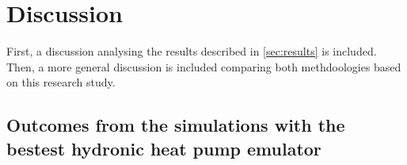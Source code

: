 \begin{comment}
\begin{figure}
  \texttt{[image: boptest/Fig7.eps]}
\caption{Indoor zone temperature through the simulation for the baseline, the MPC and program synthesis in typical heat period, together with the lower and upper comfort limits and temperature setpoint for baseline controller.}
\label{fig:7}       %
\end{figure}
%


The evolution in the thermal discomfort corresponds to this cumulative thermal discomfort along the simulation, depicted in Figure \ref{fig:8}.

\begin{figure}
\texttt{[image: boptest/Fig8.eps]}
\caption{Thermal discomfort for the baseline and the three MPC scenarios in the typical heat day simulation.}
\label{fig:8}       %
\end{figure}
%

The performance of the MPC compared to the baseline for the second objective, which is the reduction is cost, is reflected in Figure \ref{fig:9} which depicts the energy cost accross the simulation.

\begin{figure}
  \texttt{[image: boptest/Fig9.eps]}
\caption{Evolution of the energy cost for the baseline and MPC with different electricity price schemes for a typical heat day week.}
\label{fig:9}       %
\end{figure}
\end{comment}

\newpage
\section{Discussion}
\label{sec:discussion}
First, a discussion analysing the results described in \ref{sec:results} is included. Then, a more general discussion is included comparing both methdoologies based on this research study.

\subsection{Outcomes from the simulations with the bestest hydronic heat pump emulator}

